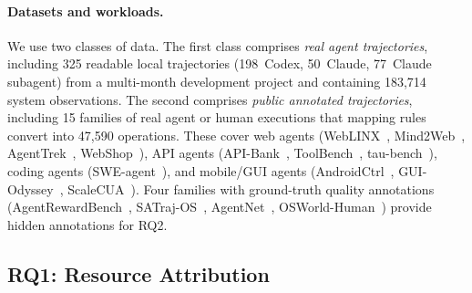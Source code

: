 \documentclass[letterpaper]{article}
\begin{document}
\paragraph{Datasets and workloads.}
We use two classes of data.
The first class comprises \emph{real agent trajectories}, including 325
readable local trajectories (198~Codex, 50~Claude, 77~Claude subagent) from a
multi-month development project and containing 183{,}714 system observations.
The second comprises \emph{public annotated trajectories}, including 15
families of real agent or human executions that mapping rules convert into
47{,}590 operations.
These cover web agents (WebLINX~\cite{weblinx}, Mind2Web~\cite{mind2web}, AgentTrek~\cite{agenttrek}, WebShop~\cite{webshop}), API agents (API-Bank~\cite{apibank}, ToolBench~\cite{toolbench}, tau-bench~\cite{taubench}), coding agents (SWE-agent~\cite{sweagent}), and mobile/GUI agents (AndroidCtrl~\cite{androidcontrol}, GUI-Odyssey~\cite{guiodyssey}, ScaleCUA~\cite{scalecua}).
Four families with ground-truth quality annotations (AgentRewardBench~\cite{agentrewardbench}, SATraj-OS~\cite{safactory}, AgentNet~\cite{agentnet}, OSWorld-Human~\cite{osworldhuman}) provide hidden annotations for RQ2.

\subsection{RQ1: Resource Attribution}
\end{document}
